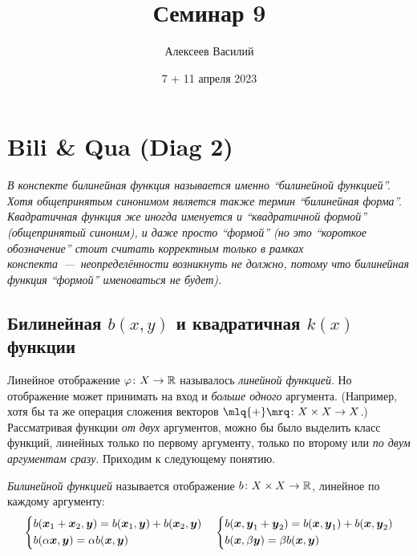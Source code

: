 \documentclass[a4paper,12pt]{article}
\author{Алексеев Василий}
\title{Семинар 9}
\date{7 + 11 апреля 2023}
\begin{document}
  \maketitle
  
  \tableofcontents

  \thispagestyle{empty}
  
  \newpage
  


  \section{Bili \& Qua (Diag 2)}
  
  \emph{
    В конспекте билинейная функция называется именно ``билинейной функцией''.
    Хотя общепринятым синонимом является также термин ``билинейная форма''.
    Квадратичная функция же иногда именуется и ``квадратичной формой'' (общепринятый синоним), и даже просто ``формой'' (но это ``короткое обозначение'' стоит считать корректным только в рамках конспекта~---~неопределённости возникнуть не должно, потому что билинейная функция ``формой'' именоваться не будет).
  }
  
  \subsection{Билинейная $b(x, y)$ и квадратичная $k(x)$ функции}
  
  Линейное отображение $\phi\colon X \hm\to \RR$ называлось \emph{линейной функцией}.
  Но отображение может принимать на вход и \emph{больше одного} аргумента.
  (Например, хотя бы та же операция сложения векторов $\mlq{+}\mrq\colon X \hm\times X \hm\to X$.)
  Рассматривая функции \emph{от двух} аргументов, можно бы было выделить класс функций, линейных только по первому аргументу, только по второму или \emph{по двум аргументам сразу}.
  Приходим к следующему понятию.
  
  \begin{definition}
    \emph{Билинейной функцией} называется отображение $b\colon X \hm\times X \hm\to \RR$, линейное по каждому аргументу:
    \[
      \left\{
        \begin{aligned}
          &b(\boldsymbol x_1 + \boldsymbol x_2, \boldsymbol y) = b(\boldsymbol x_1, \boldsymbol y) + b(\boldsymbol x_2, \boldsymbol y)\\
          &b(\alpha \boldsymbol x, \boldsymbol y) = \alpha b(\boldsymbol x, \boldsymbol y)
        \end{aligned}
      \right.
      \quad \left\{
        \begin{aligned}
          &b(\boldsymbol x, \boldsymbol y_1 + \boldsymbol y_2) = b(\boldsymbol x, \boldsymbol y_1) + b(\boldsymbol x, \boldsymbol y_2)\\
          &b(\boldsymbol x, \beta \boldsymbol y) = \beta b(\boldsymbol x, \boldsymbol y)
        \end{aligned}
      \right.
    \]
  \end{definition}
  
\end{document}
